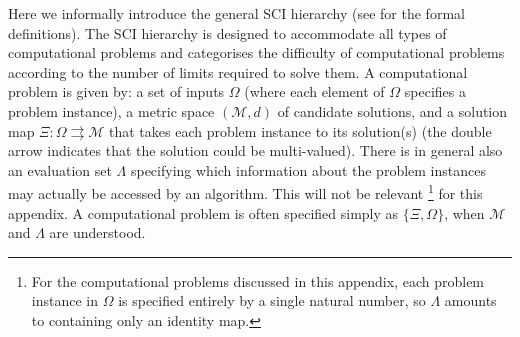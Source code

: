 \documentclass[10pt, a4paper, reqno]{amsart}
\numberwithin{equation}{section}
\theoremstyle{definition}
\theoremstyle{definition}
\begin{document}
Here we informally introduce the general SCI hierarchy (see \cite{SCI, ColbrookAntunHansen2022} for the formal definitions). The SCI hierarchy is designed to accommodate all types of computational problems and categorises the difficulty of computational problems according to the number of limits required to solve them. A computational problem is given by: a set of inputs $\Omega$ (where each element of $\Omega$ specifies a problem instance), a metric space $(\mathcal{M}, d)$ of candidate solutions, and a solution map $\Xi : \Omega \rightrightarrows \mathcal{M}$ that takes each problem instance to its solution(s) (the double arrow indicates that the solution could be multi-valued). There is in general also an evaluation set $\Lambda$ specifying which information about the problem instances may actually be accessed by an algorithm. This will not be relevant \footnote{For the computational problems discussed in this appendix, each problem instance in $\Omega$ is specified entirely by a single natural number, so $\Lambda$ amounts to containing only an identity map.} for this appendix. A computational problem is often specified simply as $\{\Xi, \Omega\}$, when $\mathcal{M}$ and $\Lambda$ are understood. 
\end{document}
